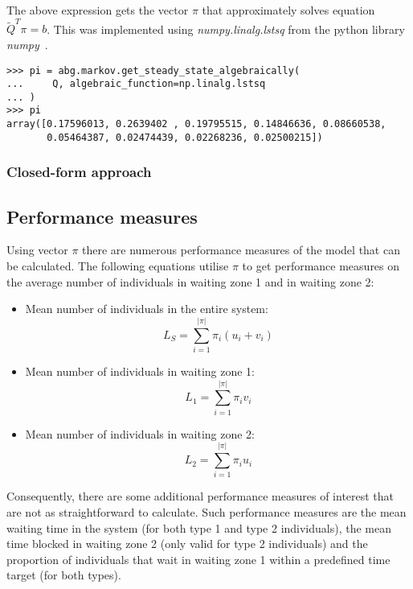 The above expression gets the vector \( \pi \) that approximately solves
equation \(\tilde Q^T \pi = b\).
This was implemented using \textit{numpy.linalg.lstsq} from the python
library \textit{numpy}~\cite{2020NumPy-Array}.

\begin{lstlisting}[style=pystyle]
>>> pi = abg.markov.get_steady_state_algebraically(
...     Q, algebraic_function=np.linalg.lstsq
... )
>>> pi
array([0.17596013, 0.2639402 , 0.19795515, 0.14846636, 0.08660538,
       0.05464387, 0.02474439, 0.02268236, 0.02500215])

\end{lstlisting}

\subsubsection{Closed-form approach}

\subsection{Performance measures}
Using vector \(\pi\) there are numerous performance measures of the model that
can be calculated.
The following equations utilise \(\pi\) to get performance measures on the
average number of individuals in waiting zone 1 and in waiting zone 2:

\begin{itemize}
    \item Mean number of individuals in the entire system:
        \begin{equation}
            L_S = \sum_{i=1}^{|\pi|} \pi_i (u_i + v_i)
        \end{equation}
    \item Mean number of individuals in waiting zone 1:
        \begin{equation}
            L_1 = \sum_{i=1}^{|\pi|} \pi_i v_i
        \end{equation}
    \item Mean number of individuals in waiting zone 2:
        \begin{equation}
            L_2 = \sum_{i=1}^{|\pi|} \pi_i u_i
        \end{equation}
\end{itemize}

Consequently, there are some additional performance measures of interest that
are not as straightforward to calculate.
Such performance measures are the mean waiting time in the system (for both
type 1 and type 2 individuals), the mean time blocked in waiting zone 2 (only
valid for type 2 individuals) and the proportion of individuals that wait in
waiting zone 1 within a predefined time target (for both types).

